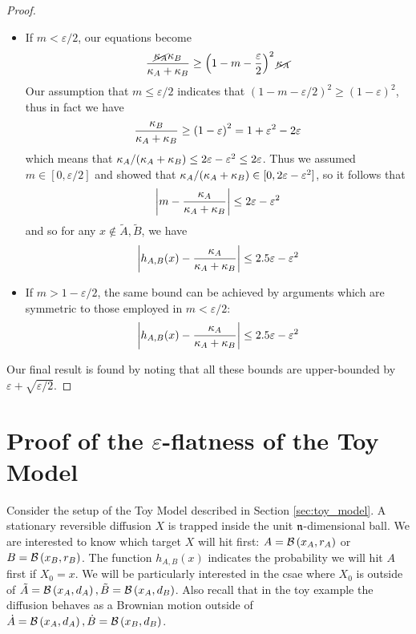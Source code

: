 \documentclass[english, aip, jcp, priprint, graphicx,floatfix]{revtex4-1}
\theoremstyle{plain}
\theoremstyle{definition}
\theoremstyle{plain}
\begin{document}
\begin{proof}
\begin{itemize}
    \item If $m<\varepsilon/2$, our equations become 
    \[
    \frac{\cancel{\kappa_A} \kappa_B}{\kappa_A +\kappa_B}
    \geq
    \left( 1-m- \frac{\varepsilon}{2} \right)^2 \cancel{\kappa_A} 
    \]
    Our assumption that $m \leq \varepsilon/2$ indicates that $(1- m- \varepsilon/2)^2 \geq (1-\varepsilon)^2$, thus in fact we have 
    \[
    \frac{\kappa_B}{\kappa_A +\kappa_B}
    \geq
    \left( 1- \varepsilon \right)^2  = 1 + \varepsilon^2 - 2\varepsilon
    \]
    which means that $\kappa_A/(\kappa_A +\kappa_B)
    \leq
    2\varepsilon - \varepsilon^2 \leq 2\varepsilon$.  
    Thus we assumed $m\in[0,\varepsilon/2]$ and showed that $\kappa_A/(\kappa_A+\kappa_B)\in[0,2\varepsilon-\varepsilon^2]$, so it follows that 
    \[
    \left|m -  \frac{\kappa_A}{\kappa_A + \kappa_B}\right| \leq 2\varepsilon -\varepsilon^2
    \]
    and so for any $x\notin \tilde A,\tilde B$, we have 
    \[
    \left|h_{A,B}(x) -  \frac{\kappa_A}{\kappa_A + \kappa_B}\right| \leq 2.5\varepsilon -\varepsilon^2
    \]
    
    \item If $m>1-\varepsilon/2$, the same bound can be achieved by arguments which are symmetric to those employed in $m<\varepsilon/2$:
    \[
    \left|h_{A,B}(x) -  \frac{\kappa_A}{\kappa_A + \kappa_B}\right| \leq 2.5\varepsilon -\varepsilon^2
    \]
\end{itemize}
Our final result is found by noting that all these bounds are upper-bounded by $\varepsilon + \sqrt{\varepsilon/2}$.
\end{proof}

           

\section{Proof of the $\varepsilon$-flatness of the Toy Model}\label{sec:proof_epsilon_flat}

Consider the setup of the Toy Model described in Section \ref{sec:toy_model}.  A stationary reversible diffusion $X$ is trapped inside the unit ${\mathfrak{n}}$-dimensional ball.  We are interested to know which target $X$ will hit first: $A=\mathcal{B}\left(x_A,r_A\right)$ or $B=\mathcal{B}\left(x_B,r_B\right)$.  The function $h_{A,B}(x)$ indicates the probability we will hit $A$ first if $X_0=x$.  We will be particularly interested in the csae where $X_0$ is outside of $\tilde A=\mathcal{B}\left(x_A,d_A\right),\tilde B=\mathcal{B}\left(x_A,d_B\right)$.  Also recall that in the toy example the diffusion behaves as a Brownian motion outside of $\dot A=\mathcal{B}\left(x_A,d_A\right),\dot B=\mathcal{B}\left(x_B,d_B\right)$.  
\end{document}

